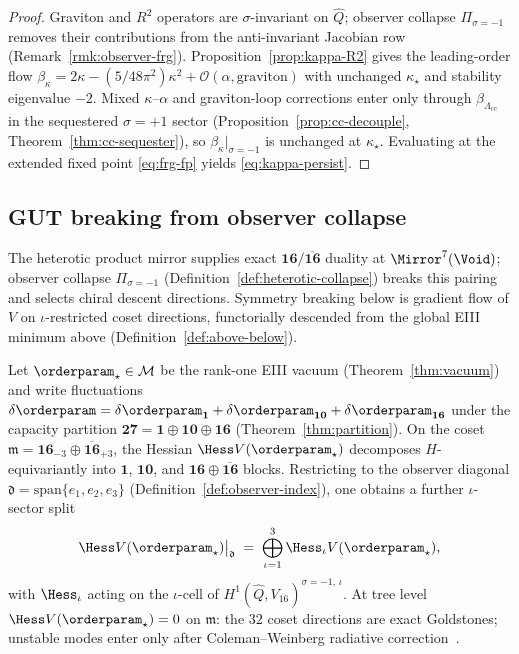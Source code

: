 \begin{proof}
Graviton and $R^2$ operators are $\sigma$-invariant on $\hat Q$; observer
collapse $\Pi_{\sigma=-1}$ removes their contributions from the anti-invariant
Jacobian row (Remark~\ref{rmk:observer-frg}). Proposition~\ref{prop:kappa-R2}
gives the leading-order flow
$\beta_\kappa=2\kappa-(5/48\pi^2)\kappa^2+\mathcal{O}(\alpha,\text{graviton})$
with unchanged $\kappa_\star$ and stability eigenvalue $-2$. Mixed
$\kappa$--$\alpha$ and graviton-loop corrections enter only through
$\beta_{\Lambda_{\mathrm{cc}}}$ in the sequestered $\sigma=+1$ sector
(Proposition~\ref{prop:cc-decouple}, Theorem~\ref{thm:cc-sequester}), so
$\beta_\kappa|_{\sigma=-1}$ is unchanged at $\kappa_\star$. Evaluating at the
extended fixed point \eqref{eq:frg-fp} yields \eqref{eq:kappa-persist}.
\end{proof}

\subsection{GUT breaking from observer collapse}
\label{sec:physics:breaking}

The heterotic product mirror supplies exact
$\mathbf{16}/\overline{\mathbf{16}}$ duality at $\Mirror^7(\Void)$; observer
collapse $\Pi_{\sigma=-1}$ (Definition~\ref{def:heterotic-collapse}) breaks
this pairing and selects chiral descent directions. Symmetry breaking below is
gradient flow of $V$ on $\iota$-restricted coset directions, functorially
descended from the global EIII minimum above
(Definition~\ref{def:above-below}).

\begin{lemma}\label{lem:breaking-hess}
Let $\orderparam_\star\in\mathcal{M}$ be the rank-one EIII vacuum
(Theorem~\ref{thm:vacuum}) and write fluctuations
$\delta\orderparam=\delta\orderparam_{\mathbf{1}}+\delta\orderparam_{\mathbf{10}}+\delta\orderparam_{\mathbf{16}}$
under the capacity partition
$\mathbf{27}=\mathbf{1}\oplus\mathbf{10}\oplus\mathbf{16}$
(Theorem~\ref{thm:partition}). On the coset
$\mathfrak{m}=\mathbf{16}_{-3}\oplus\overline{\mathbf{16}}_{+3}$, the Hessian
$\Hess V(\orderparam_\star)$ decomposes $H$-equivariantly into $\mathbf{1}$,
$\mathbf{10}$, and $\mathbf{16}\oplus\overline{\mathbf{16}}$ blocks. Restricting
to the observer diagonal $\mathfrak{d}=\mathrm{span}\{e_1,e_2,e_3\}$
(Definition~\ref{def:observer-index}), one obtains a further $\iota$-sector
split
\begin{equation}\label{eq:breaking-hess-iota}
  \Hess V(\orderparam_\star)\big|_{\mathfrak{d}}
  \;=\;
  \bigoplus_{\iota=1}^3 \Hess_\iota V(\orderparam_\star),
\end{equation}
with $\Hess_\iota$ acting on the $\iota$-cell of
$H^1(\hat Q,V_{16})^{\sigma=-1,\,\iota}$. At tree level
$\Hess V(\orderparam_\star)=0$ on $\mathfrak{m}$: the $32$ coset directions are
exact Goldstones; unstable modes enter only after Coleman--Weinberg radiative
correction~\cite{ColemanWeinberg1973}.
\end{lemma}

